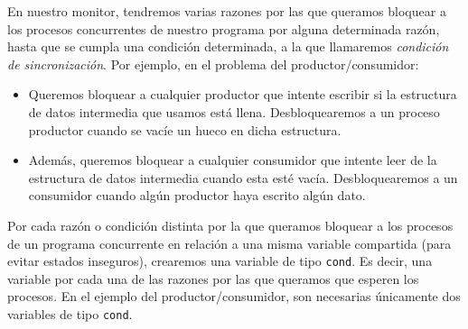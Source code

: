 En nuestro monitor, tendremos varias razones por las que queramos bloquear a los procesos concurrentes de nuestro programa por alguna determinada razón, hasta que se cumpla una condición determinada, a la que llamaremos \textit{condición de sincronización}. Por ejemplo, en el problema del productor/consumidor:
\begin{itemize}
    \item Queremos bloquear a cualquier productor que intente escribir si la estructura de datos intermedia que usamos está llena. Desbloquearemos a un proceso productor cuando se vacíe un hueco en dicha estructura.
    \item Además, queremos bloquear a cualquier consumidor que intente leer de la estructura de datos intermedia cuando esta esté vacía. Desbloquearemos a un consumidor cuando algún productor haya escrito algún dato.
\end{itemize}
Por cada razón o condición distinta por la que queramos bloquear a los procesos de un programa concurrente en relación a una misma variable compartida (para evitar estados inseguros), crearemos una variable de tipo \verb|cond|. Es decir, una variable por cada una de las razones por las que queramos que esperen los procesos. En el ejemplo del productor/consumidor, son necesarias únicamente dos variables de tipo \verb|cond|.\\

